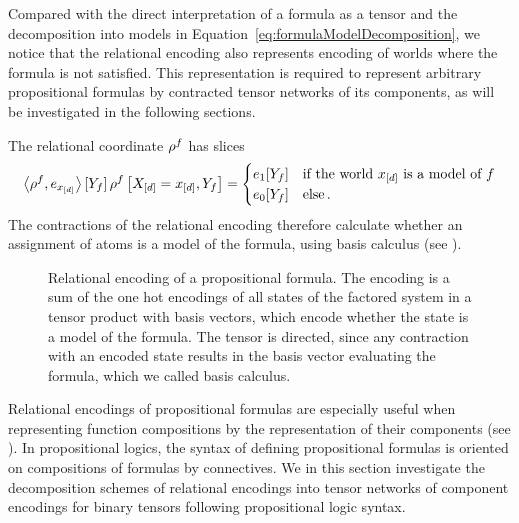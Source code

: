 Compared with the direct interpretation of a formula as a tensor and the decomposition into models in Equation~\ref{eq:formulaModelDecomposition}, we notice that the relational encoding also represents encoding of worlds where the formula is not satisfied.
This representation is required to represent arbitrary propositional formulas by contracted tensor networks of its components, as will be investigated in the following sections.


The relational coordinate $\rho^{f}$ has slices
\begin{align}
	\left\langle \rho^{f},e_{x_{[d]}}\right\rangle \left[ Y_{f} \right] 
		\rho^{f}\left[X_{[d]}=x_{[d]},Y_{f}\right]
	= \begin{cases}
		e_1[Y_{f}] & \text{if the world $x_{[d]}$ is a model of $f$}  \\
		e_0[Y_{f}] & \text{else}\, .
		\end{cases}
\end{align} 
The contractions of the relational encoding therefore calculate whether an assignment of atoms is a model of the formula, using basis calculus (see ).

\begin{figure}[h]
\begin{center}
	
\end{center}
\caption{Relational encoding of a propositional formula. 
The encoding is a sum of the one hot encodings of all states of the factored system in a tensor product with basis vectors, which encode whether the state is a model of the formula.
The tensor is directed, since any contraction with an encoded state results in the basis vector evaluating the formula, which we called basis calculus.
}
\label{fig:formulaRencoding} 
\end{figure}











Relational encodings of propositional formulas are especially useful when representing function compositions by the representation of their components (see ).
In propositional logics, the syntax of defining propositional formulas is oriented on compositions of formulas by connectives. %
We in this section investigate the decomposition schemes of relational encodings into tensor networks of component encodings for binary tensors following propositional logic syntax.

